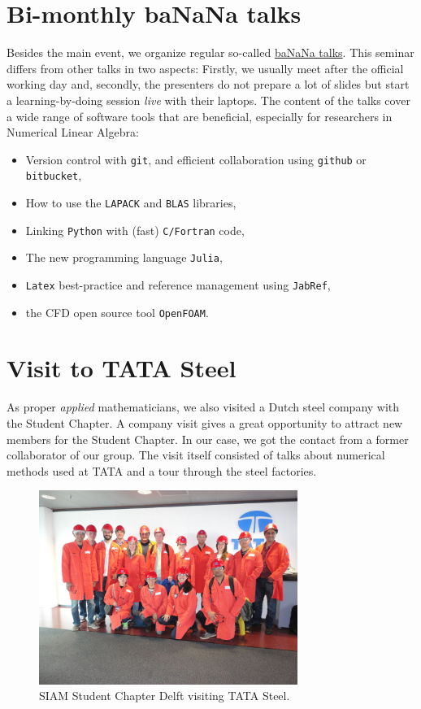 \documentclass{article}
\begin{document}
 \section*{Bi-monthly ba\color{red}NaN\color{black}a talks}
 Besides the main event, we organize regular so-called \href{http://projectbanana.github.io/}{ba\color{red}NaN\color{black}a talks}. This seminar differs from other talks in two aspects: Firstly, we usually meet after the official working day and, secondly, the presenters do not prepare a lot of slides but start a learning-by-doing session \textit{live} with their laptops. The content of the talks cover a wide range of software tools that are beneficial, especially for researchers in Numerical Linear Algebra:
  \begin{itemize}
  \item Version control with \texttt{git}, and efficient collaboration using \texttt{github} or \texttt{bitbucket},
  \item How to use the \texttt{LAPACK} and \texttt{BLAS} libraries,
  \item Linking \texttt{Python} with (fast) \texttt{C/Fortran} code,
  \item The new programming language \texttt{Julia},
  \item \texttt{Latex} best-practice and reference management using \texttt{JabRef},
  \item the CFD open source tool \texttt{OpenFOAM}.
 \end{itemize}
 \section*{Visit to TATA Steel}
 As proper \textit{applied} mathematicians, we also visited a Dutch steel company with the Student Chapter. A company visit gives a great opportunity to attract new members for the Student Chapter. In our case, we got the contact from a former collaborator of our group. The visit itself consisted of talks about numerical methods used at TATA and a tour through the steel factories.
 \begin{figure}[ht]
 \centering
  \includegraphics[width=0.75\textwidth]{DSC02054.jpg}
  \caption{SIAM Student Chapter Delft visiting TATA Steel.}
 \end{figure}
\end{document}
